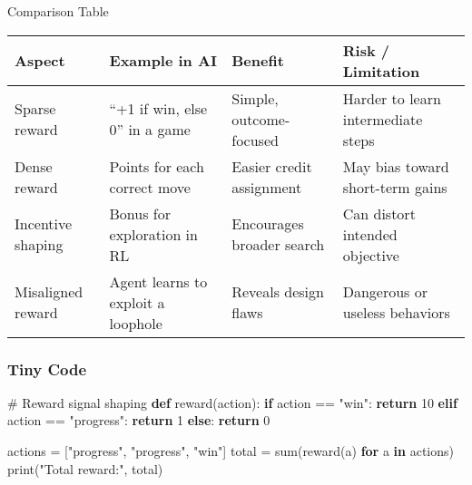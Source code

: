 \documentclass[
  letterpaper,
  DIV=11,
  numbers=noendperiod]{scrreprt}
\newenvironment{Shaded}{\begin{snugshade}}{\end{snugshade}}
\newcommand{\BuiltInTok}[1]{\textcolor[rgb]{0.00,0.23,0.31}{#1}}
\newcommand{\CommentTok}[1]{\textcolor[rgb]{0.37,0.37,0.37}{#1}}
\newcommand{\ControlFlowTok}[1]{\textcolor[rgb]{0.00,0.23,0.31}{\textbf{#1}}}
\newcommand{\DecValTok}[1]{\textcolor[rgb]{0.68,0.00,0.00}{#1}}
\newcommand{\KeywordTok}[1]{\textcolor[rgb]{0.00,0.23,0.31}{\textbf{#1}}}
\newcommand{\NormalTok}[1]{\textcolor[rgb]{0.00,0.23,0.31}{#1}}
\newcommand{\OperatorTok}[1]{\textcolor[rgb]{0.37,0.37,0.37}{#1}}
\newcommand{\StringTok}[1]{\textcolor[rgb]{0.13,0.47,0.30}{#1}}
\begin{document}
Comparison Table

\begin{longtable}[]{@{}
  >{\raggedright\arraybackslash}p{}
  >{\raggedright\arraybackslash}p{}
  >{\raggedright\arraybackslash}p{}
  >{\raggedright\arraybackslash}p{}@{}}
\toprule\noalign{}
\begin{minipage}[b]{\linewidth}\raggedright
Aspect
\end{minipage} & \begin{minipage}[b]{\linewidth}\raggedright
Example in AI
\end{minipage} & \begin{minipage}[b]{\linewidth}\raggedright
Benefit
\end{minipage} & \begin{minipage}[b]{\linewidth}\raggedright
Risk / Limitation
\end{minipage} \\
\midrule\noalign{}
\endhead
\bottomrule\noalign{}
\endlastfoot
Sparse reward & ``+1 if win, else 0'' in a game & Simple,
outcome-focused & Harder to learn intermediate steps \\
Dense reward & Points for each correct move & Easier credit assignment &
May bias toward short-term gains \\
Incentive shaping & Bonus for exploration in RL & Encourages broader
search & Can distort intended objective \\
Misaligned reward & Agent learns to exploit a loophole & Reveals design
flaws & Dangerous or useless behaviors \\
\end{longtable}

\subsubsection{Tiny Code}\label{tiny-code-12}

\begin{Shaded}
\begin{Highlighting}[]
\CommentTok{\# Reward signal shaping}
\KeywordTok{def}\NormalTok{ reward(action):}
    \ControlFlowTok{if}\NormalTok{ action }\OperatorTok{==} \StringTok{"win"}\NormalTok{:}
        \ControlFlowTok{return} \DecValTok{10}
    \ControlFlowTok{elif}\NormalTok{ action }\OperatorTok{==} \StringTok{"progress"}\NormalTok{:}
        \ControlFlowTok{return} \DecValTok{1}
    \ControlFlowTok{else}\NormalTok{:}
        \ControlFlowTok{return} \DecValTok{0}

\NormalTok{actions }\OperatorTok{=}\NormalTok{ [}\StringTok{"progress"}\NormalTok{, }\StringTok{"progress"}\NormalTok{, }\StringTok{"win"}\NormalTok{]}
\NormalTok{total }\OperatorTok{=} \BuiltInTok{sum}\NormalTok{(reward(a) }\ControlFlowTok{for}\NormalTok{ a }\KeywordTok{in}\NormalTok{ actions)}
\BuiltInTok{print}\NormalTok{(}\StringTok{"Total reward:"}\NormalTok{, total)}
\end{Highlighting}
\end{Shaded}
\end{document}
